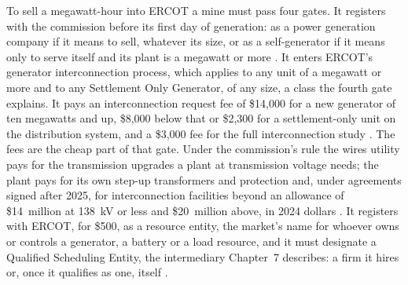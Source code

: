 To sell a megawatt-hour into ERCOT a mine must pass four gates. It registers with the commission before its first day of generation: as a power generation company if it means to sell, whatever its size, or as a self-generator if it means only to serve itself and its plant is a megawatt or more \autocite{puct25109}. %
It enters ERCOT's generator interconnection process, which applies to any unit of a megawatt or more and to any Settlement Only Generator, of any size, a class the fourth gate explains. It pays an interconnection request fee of \$14,000 for a new generator of ten megawatts and up, \$8,000 below that or \$2,300 for a settlement-only unit on the distribution system, and a \$3,000 fee for the full interconnection study \autocite{ercotplanningguide2026,ercotfeeschedule2025}. %
The fees are the cheap part of that gate. Under the commission's rule the wires utility pays for the transmission upgrades a plant at transmission voltage needs; the plant pays for its own step-up transformers and protection and, under agreements signed after 2025, for interconnection facilities beyond an allowance of \$14~million at 138~kV or less and \$20~million above, in 2024 dollars \autocite{puct25195}. %
It registers with ERCOT, for \$500, as a resource entity, the market's name for whoever owns or controls a generator, a battery or a load resource, and it must designate a Qualified Scheduling Entity, the intermediary Chapter~7 describes: a firm it hires or, once it qualifies as one, itself \autocite{ercotfeeschedule2025,ercot2026protocols}. %

